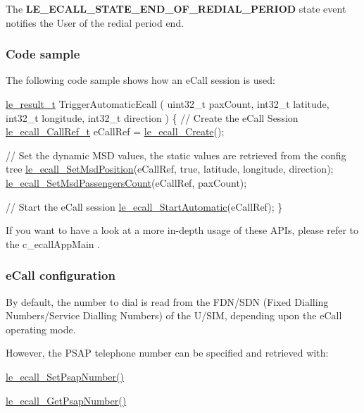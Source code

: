 The {\bfseries L\+E\+\_\+\+E\+C\+A\+L\+L\+\_\+\+S\+T\+A\+T\+E\+\_\+\+E\+N\+D\+\_\+\+O\+F\+\_\+\+R\+E\+D\+I\+A\+L\+\_\+\+P\+E\+R\+I\+O\+D} state event notifies the User of the redial period end.\hypertarget{c_ecall_le_ecall_samples}{}\subsubsection{Code sample}\label{c_ecall_le_ecall_samples}
The following code sample shows how an e\+Call session is used\+:


\begin{DoxyCode}
\hyperlink{le__basics_8h_a1cca095ed6ebab24b57a636382a6c86c}{le\_result\_t} TriggerAutomaticEcall
(
    uint32\_t    paxCount,
    int32\_t     latitude,
    int32\_t     longitude,
    int32\_t     direction
)
\{
    \textcolor{comment}{// Create the eCall Session}
    \hyperlink{le__ecall__interface_8h_a8536728653b7b3cdd6b298c6e7b67705}{le\_ecall\_CallRef\_t} eCallRef = \hyperlink{le__ecall__interface_8h_aad7fa3b34d9d72a2f1d4baa681ba25cc}{le\_ecall\_Create}();

    \textcolor{comment}{// Set the dynamic MSD values, the static values are retrieved from the config tree}
    \hyperlink{le__ecall__interface_8h_a2b56b7b7fd7f936c144d30eba7815908}{le\_ecall\_SetMsdPosition}(eCallRef,
                            \textcolor{keyword}{true},
                            latitude,
                            longitude,
                            direction);
    \hyperlink{le__ecall__interface_8h_a8c009bb03d61dcd0ffbd9e986b692a85}{le\_ecall\_SetMsdPassengersCount}(eCallRef, paxCount);

    \textcolor{comment}{// Start the eCall session}
    \hyperlink{le__ecall__interface_8h_aa25256eeacefcf00c14763ef294c7667}{le\_ecall\_StartAutomatic}(eCallRef);
\}
\end{DoxyCode}


If you want to have a look at a more in-\/depth usage of these A\+P\+Is, please refer to the c\+\_\+ecall\+App\+Main .\hypertarget{c_ecall_le_ecall_configuration}{}\subsubsection{e\+Call configuration}\label{c_ecall_le_ecall_configuration}
By default, the number to dial is read from the F\+D\+N/\+S\+D\+N (Fixed Dialling Numbers/\+Service Dialling Numbers) of the U/\+S\+I\+M, depending upon the e\+Call operating mode.

However, the P\+S\+A\+P telephone number can be specified and retrieved with\+:
\begin{DoxyItemize}
\item \hyperlink{le__ecall__interface_8h_a9c13a8582bca84c4ae77643e1f4cfd71}{le\+\_\+ecall\+\_\+\+Set\+Psap\+Number()}
\item \hyperlink{le__ecall__interface_8h_a91c84ca3f4bb27844bfd2d14859bf31a}{le\+\_\+ecall\+\_\+\+Get\+Psap\+Number()}
\end{DoxyItemize}

